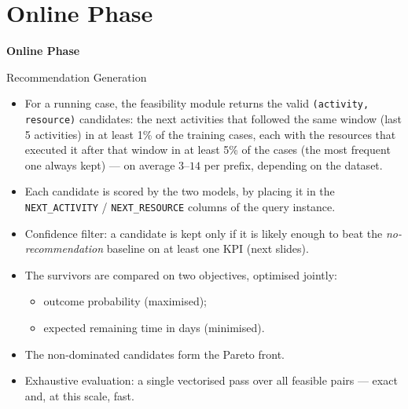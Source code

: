 \documentclass[aspectratio=169]{beamer} %
\begin{document}
\section{Online Phase}

\begin{frame}[plain,c]
    \centering
    \color{Darkcandyapplered}
    \Huge\textbf{Online Phase}
\end{frame}

\begin{frame}{Recommendation Generation}
  \small
  \begin{itemize}
    \item For a running case, the feasibility module returns the valid
      \texttt{(activity, resource)} candidates: the next activities that followed the same window (last 5
      activities) in at least 1\% of the training cases, each with the resources that executed it after that
      window in at least 5\% of the cases (the most frequent one always kept) --- on average
      $3\text{--}14$ per prefix, depending on the dataset.
    \item Each candidate is scored by the two models, by placing it in the
      \texttt{NEXT\_ACTIVITY} / \texttt{NEXT\_RESOURCE} columns of the query instance.
    \item \alert{Confidence filter:} a candidate is kept only if it is likely enough
      to beat the \emph{no-recommendation} baseline on at least one KPI (next slides).
    \item The survivors are compared on \alert{two objectives}, optimised jointly:
      \begin{itemize}
        \item outcome probability (maximised);
        \item expected remaining time in days (minimised).
      \end{itemize}
    \item The \alert{non-dominated} candidates form the Pareto front.
    \item Exhaustive evaluation: a single vectorised pass over all feasible pairs — exact and, at this scale, fast.
  \end{itemize}
\end{frame}
\end{document}

